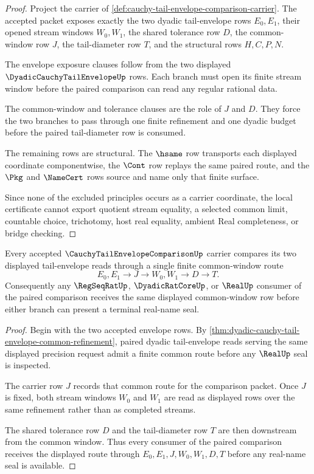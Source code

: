 \begin{proof}
Project the carrier of \autoref{def:cauchy-tail-envelope-comparison-carrier}. The accepted packet exposes exactly the two dyadic tail-envelope rows $E_0,E_1$, their opened stream windows $W_0,W_1$, the shared tolerance row $D$, the common-window row $J$, the tail-diameter row $T$, and the structural rows $H,C,P,N$.

The envelope exposure clauses follow from the two displayed $\DyadicCauchyTailEnvelopeUp$ rows. Each branch must open its finite stream window before the paired comparison can read any regular rational data.

The common-window and tolerance clauses are the role of $J$ and $D$. They force the two branches to pass through one finite refinement and one dyadic budget before the paired tail-diameter row is consumed.

The remaining rows are structural. The $\hsame$ row transports each displayed coordinate componentwise, the $\Cont$ row replays the same paired route, and the $\Pkg$ and $\NameCert$ rows source and name only that finite surface.

Since none of the excluded principles occurs as a carrier coordinate, the local certificate cannot export quotient stream equality, a selected common limit, countable choice, trichotomy, host real equality, ambient Real completeness, or bridge checking.
\end{proof}

\begin{theorem}
\label{thm:cauchy-tail-envelope-comparison-common-window}
Every accepted $\CauchyTailEnvelopeComparisonUp$ carrier compares its two displayed tail-envelope reads through a single finite common-window route
$$
E_0,E_1 \longrightarrow J \longrightarrow W_0,W_1 \longrightarrow D \longrightarrow T .
$$
Consequently any $\RegSeqRatUp$, $\DyadicRatCoreUp$, or $\RealUp$ consumer of the paired comparison receives the same displayed common-window row before either branch can present a terminal real-name seal.
\end{theorem}
\begin{proof}
Begin with the two accepted envelope rows. By \autoref{thm:dyadic-cauchy-tail-envelope-common-refinement}, paired dyadic tail-envelope reads serving the same displayed precision request admit a finite common route before any $\RealUp$ seal is inspected.

The carrier row $J$ records that common route for the comparison packet. Once $J$ is fixed, both stream windows $W_0$ and $W_1$ are read as displayed rows over the same refinement rather than as completed streams.

The shared tolerance row $D$ and the tail-diameter row $T$ are then downstream from the common window. Thus every consumer of the paired comparison receives the displayed route through $E_0,E_1,J,W_0,W_1,D,T$ before any real-name seal is available.
\end{proof}

